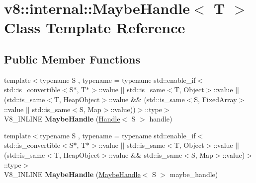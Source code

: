 \hypertarget{classv8_1_1internal_1_1MaybeHandle}{}\section{v8\+:\+:internal\+:\+:Maybe\+Handle$<$ T $>$ Class Template Reference}
\label{classv8_1_1internal_1_1MaybeHandle}
\subsection*{Public Member Functions}
\begin{DoxyCompactItemize}
\item 
\mbox{\label{classv8_1_1internal_1_1MaybeHandle_a54d57e6b5e3cfeb3e55d7cffd72ecb6e}} 
{\footnotesize template$<$typename S , typename  = typename std\+::enable\+\_\+if$<$                            std\+::is\+\_\+convertible$<$\+S$\ast$, T$\ast$$>$\+::value $\vert$$\vert$                            std\+::is\+\_\+same$<$\+T, Object$>$\+::value $\vert$$\vert$                            (std\+::is\+\_\+same$<$\+T, Heap\+Object$>$\+::value \&\&                             (std\+::is\+\_\+same$<$\+S, Fixed\+Array$>$\+::value $\vert$$\vert$                              std\+::is\+\_\+same$<$\+S, Map$>$\+::value))$>$\+::type$>$ }\\V8\+\_\+\+I\+N\+L\+I\+NE {\bfseries Maybe\+Handle} (\mbox{\hyperlink{classv8_1_1internal_1_1Handle}{Handle}}$<$ S $>$ handle)
\item 
\mbox{\label{classv8_1_1internal_1_1MaybeHandle_ad059b75dd3de2c62ebfefc9a928fbc63}} 
{\footnotesize template$<$typename S , typename  = typename std\+::enable\+\_\+if$<$                            std\+::is\+\_\+convertible$<$\+S$\ast$, T$\ast$$>$\+::value $\vert$$\vert$                            std\+::is\+\_\+same$<$\+T, Object$>$\+::value $\vert$$\vert$                            (std\+::is\+\_\+same$<$\+T, Heap\+Object$>$\+::value \&\&                             std\+::is\+\_\+same$<$\+S, Map$>$\+::value)$>$\+::type$>$ }\\V8\+\_\+\+I\+N\+L\+I\+NE {\bfseries Maybe\+Handle} (\mbox{\hyperlink{classv8_1_1internal_1_1MaybeHandle}{Maybe\+Handle}}$<$ S $>$ maybe\+\_\+handle)
\item 
\mbox{\label{classv8_1_1internal_1_1MaybeHandle_af11f95db6457bca8fb7fb6f73b5e9712}} 

\end{DoxyCompactItemize}
